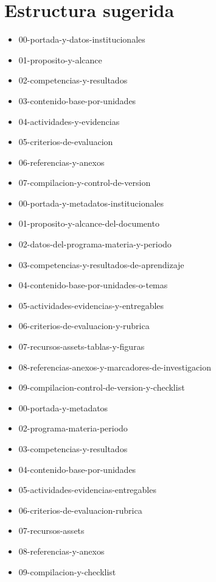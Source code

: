 \documentclass[12pt]{article}
\begin{document}
\section*{Estructura sugerida}
\begin{itemize}[leftmargin=*]
  \item 00-portada-y-datos-institucionales
  \item 01-proposito-y-alcance
  \item 02-competencias-y-resultados
  \item 03-contenido-base-por-unidades
  \item 04-actividades-y-evidencias
  \item 05-criterios-de-evaluacion
  \item 06-referencias-y-anexos
  \item 07-compilacion-y-control-de-version
  \item 00-portada-y-metadatos-institucionales
  \item 01-proposito-y-alcance-del-documento
  \item 02-datos-del-programa-materia-y-periodo
  \item 03-competencias-y-resultados-de-aprendizaje
  \item 04-contenido-base-por-unidades-o-temas
  \item 05-actividades-evidencias-y-entregables
  \item 06-criterios-de-evaluacion-y-rubrica
  \item 07-recursos-assets-tablas-y-figuras
  \item 08-referencias-anexos-y-marcadores-de-investigacion
  \item 09-compilacion-control-de-version-y-checklist
  \item 00-portada-y-metadatos
  \item 02-programa-materia-periodo
  \item 03-competencias-y-resultados
  \item 04-contenido-base-por-unidades
  \item 05-actividades-evidencias-entregables
  \item 06-criterios-de-evaluacion-rubrica
  \item 07-recursos-assets
  \item 08-referencias-y-anexos
  \item 09-compilacion-y-checklist
\end{itemize}
\end{document}
